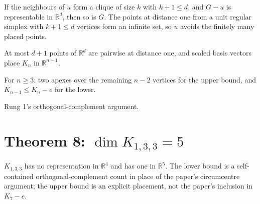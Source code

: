 \begin{lemma}
  \label{lem:reattach}
  \leanok
  If the neighbours of $u$ form a clique of size $k$ with $k + 1 \le d$, and $G - u$ is representable
  in $\mathbb{R}^d$, then so is $G$. The points at distance one from a unit regular simplex with
  $k + 1 \le d$ vertices form an infinite set, so $u$ avoids the finitely many placed points.
\end{lemma}

\begin{lemma}[$\dim K_n = n - 1$; Chaffee--Noble Lemma 1]
  \label{lem:dim-complete}
  \leanok
  At most $d + 1$ points of $\mathbb{R}^d$ are pairwise at distance one, and scaled basis vectors
  place $K_n$ in $\mathbb{R}^{n-1}$.
\end{lemma}

\begin{lemma}[$\dim (K_n - e) = n - 2$; Chaffee--Noble Lemma 2]
  \label{lem:dim-complete-minus-edge}
  \leanok
  For $n \ge 3$: two apexes over the remaining $n - 2$ vertices for the upper bound, and
  $K_{n-1} \le K_n - e$ for the lower.
\end{lemma}

\begin{lemma}
  \label{lem:k33-lower}
  \leanok
  Rung 1's orthogonal-complement argument.
\end{lemma}

\section{Theorem 8: $\dim K_{1,3,3} = 5$}

\begin{theorem}
  \label{thm:k133-dimension}
  \leanok
  $K_{1,3,3}$ has no representation in $\mathbb{R}^4$ and has one in $\mathbb{R}^5$. The lower
  bound is a self-contained orthogonal-complement count in place of the paper's circumcentre
  argument; the upper bound is an explicit placement, not the paper's inclusion in $K_7 - e$.
\end{theorem}

